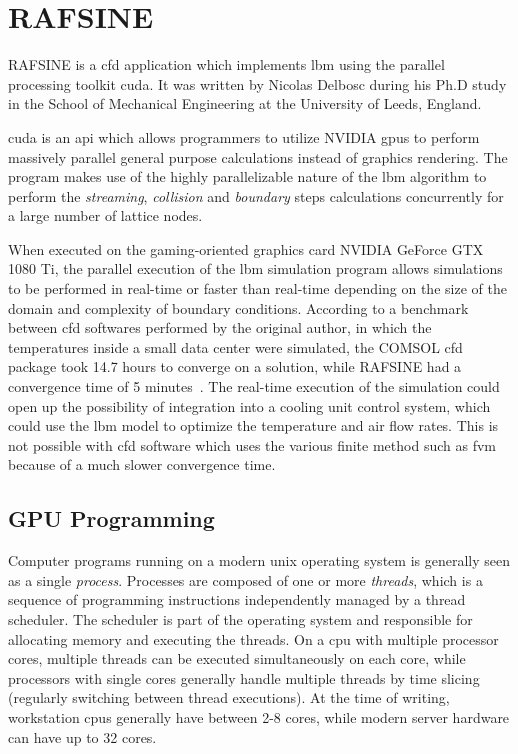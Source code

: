 \section{RAFSINE}\label{sec:rafsine}
RAFSINE is a \gls{cfd} application which implements \gls{lbm} using the  parallel processing toolkit \gls{cuda}. It was written by Nicolas Delbosc during his Ph.D study in the School of Mechanical Engineering at the University of Leeds, England.

\gls{cuda} is an \gls{api} which allows programmers to utilize NVIDIA \gls{gpu}s to perform massively parallel general purpose calculations instead of graphics rendering. The program makes use of the highly parallelizable nature of the \gls{lbm} algorithm to perform the \textit{streaming}, \textit{collision} and \textit{boundary} steps calculations concurrently for a large number of lattice nodes. 

When executed on the gaming-oriented graphics card NVIDIA GeForce GTX 1080 Ti, the parallel execution of the \gls{lbm} simulation program allows simulations to be performed in real-time or faster than real-time depending on the size of the domain and complexity of boundary conditions. According to a benchmark between \gls{cfd} softwares performed by the original author, in which the temperatures inside a small data center were simulated, the COMSOL \gls{cfd} package took 14.7 hours to converge on a solution, while RAFSINE had a convergence time of 5 minutes~\cites[pg.168]{Delbosc}. The real-time execution of the simulation could open up the possibility of integration into a cooling unit control system, which could use the \gls{lbm} model to optimize the temperature and air flow rates. This is not possible with \gls{cfd} software which uses the various finite method such as \gls{fvm} because of a much slower convergence time.
\clearpage
\subsection{GPU Programming}
Computer programs running on a modern \gls{unix} operating system is generally seen as a single \textit{process}. Processes are composed of one or more \textit{threads}, which is a sequence of programming instructions independently managed by a thread scheduler. The scheduler is part of the operating system and responsible for allocating memory and executing the threads. On a \gls{cpu} with multiple processor cores, multiple threads can be executed simultaneously on each core, while processors with single cores generally handle multiple threads by time slicing (regularly switching between thread executions). At the time of writing, workstation \gls{cpu}s generally have between 2-8 cores, while modern server hardware can have up to 32 cores.


